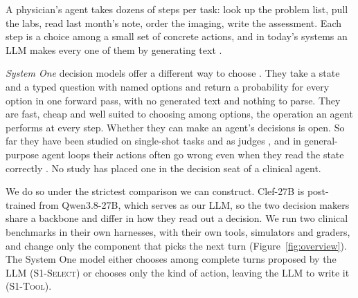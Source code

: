\documentclass[11pt]{article}
\newcommand{\sel}{\textsc{S1-Select}}
\newcommand{\tool}{\textsc{S1-Tool}}
\begin{document}
A physician's agent takes dozens of steps per task: look up the problem list, pull the labs, read last month's note,
order the imaging, write the assessment. Each step is a choice among a small set of concrete actions, and in today's
systems an LLM makes every one of them by generating text \citep{physicianbench2026,clinenv2026,yao2023react}.

\emph{System One} decision models offer a different way to choose \citep{typesafe2026jev,clef2026}. They take a
state and a typed question with named options and return a probability for every option in one forward pass, with no
generated text and nothing to parse. They are fast, cheap and well suited to choosing among options, the operation an
agent performs at every step. Whether they can make an agent's decisions is open. So far they have been studied on
single-shot tasks and as judges \citep{li2026jevjudge}, and in general-purpose agent loops their actions often go wrong
even when they read the state correctly \citep{li2026reading}. No study has placed one in the decision seat of a
clinical agent.

We do so under the strictest comparison we can construct. Clef-27B is post-trained from Qwen3.8-27B, which serves as
our LLM, so the two decision makers share a backbone and differ in how they read out a decision. We run two clinical
benchmarks in their own harnesses, with their own tools, simulators and graders, and change only the component that
picks the next turn (Figure~\ref{fig:overview}). The System One model either chooses among complete turns proposed by
the LLM (\sel) or chooses only the kind of action, leaving the LLM to write it (\tool).
\end{document}
